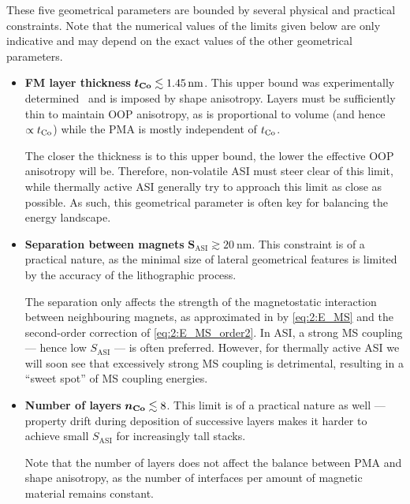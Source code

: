 These five geometrical parameters are bounded by several physical and practical constraints.
Note that the numerical values of the limits given below are only indicative and may depend on the exact values of the other geometrical parameters.
\begin{itemize}
	\item \textbf{FM layer thickness} $\boldsymbol{t_{\ce{Co}}} \lesssim \SI{1.45}{\nano\metre}$. \newline
	This upper bound was experimentally determined~\cite{KUR-24} and is imposed by shape anisotropy.
	Layers must be sufficiently thin to maintain OOP anisotropy, as  is proportional to volume (and hence $\propto t_{\ce{Co}}$) while the PMA is mostly independent of $t_{\ce{Co}}$. \par %
	The closer the thickness is to this upper bound, the lower the effective OOP anisotropy will be.
	Therefore, non-volatile ASI must steer clear of this limit, while thermally active ASI generally try to approach this limit as close as possible.
	As such, this geometrical parameter is often key for balancing the energy landscape.
	\item \textbf{Separation between magnets} $\boldsymbol{S_\mathrm{ASI}} \gtrsim \SI{20}{\nano\metre}$. \newline
	This constraint is of a practical nature, as the minimal size of lateral geometrical features is limited by the accuracy of the lithographic process. \par
	The separation only affects the strength of the magnetostatic interaction between neighbouring magnets, as approximated in \hotspice by \cref{eq:2:E_MS} and the second-order correction of \cref{eq:2:E_MS_order2}.
	In ASI, a strong MS coupling --- hence low $S_\mathrm{ASI}$ --- is often preferred.
	However, for thermally active ASI we will soon see that excessively strong MS coupling is detrimental, resulting in a ``sweet spot'' of MS coupling energies.
	\item \textbf{Number of layers} $\boldsymbol{n_{\ce{Co}}} \lesssim 8$. \newline
	This limit is of a practical nature as well --- property drift during deposition of successive layers makes it harder to achieve small $S_\mathrm{ASI}$ for increasingly tall stacks. \par
	Note that the number of layers does not affect the balance between PMA and shape anisotropy, as the number of interfaces per amount of magnetic material remains constant.

\end{itemize}
